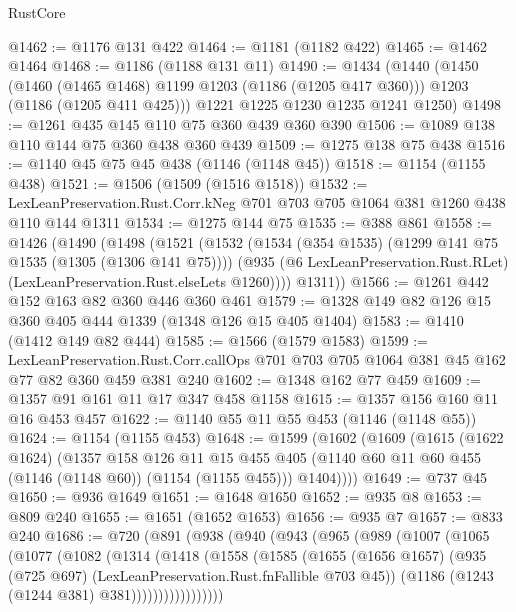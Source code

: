 \begin{lexlean}{RustCore}
\begin{coremodule}
@1462 := @1176 @131 @422
@1464 := @1181 (@1182 @422)
@1465 := @1462 @1464
@1468 := @1186 (@1188 @131 @11)
@1490 := @1434
    (@1440
      (@1450
        (@1460 (@1465 @1468) @1199 @1203 (@1186 (@1205 @417 @360)))
        @1203
        (@1186 (@1205 @411 @425)))
      @1221
      @1225
      @1230
      @1235
      @1241
      @1250)
@1498 := @1261 @435 @145 @110 @75 @360 @439 @360 @390
@1506 := @1089 @138 @110 @144 @75 @360 @438 @360 @439
@1509 := @1275 @138 @75 @438
@1516 := @1140 @45 @75 @45 @438 (@1146 (@1148 @45))
@1518 := @1154 (@1155 @438)
@1521 := @1506 (@1509 (@1516 @1518))
@1532 := LexLeanPreservation.Rust.Corr.kNeg @701 @703 @705 @1064 @381 @1260 @438 @110 @144 @1311
@1534 := @1275 @144 @75
@1535 := @388 @861
@1558 := @1426
    (@1490
      (@1498
        (@1521
          (@1532
            (@1534 (@354 @1535) (@1299 @141 @75 @1535 (@1305 (@1306 @141 @75))))
            (@935 (@6 LexLeanPreservation.Rust.RLet) (LexLeanPreservation.Rust.elseLets @1260))))
        @1311))
@1566 := @1261 @442 @152 @163 @82 @360 @446 @360 @461
@1579 := @1328 @149 @82 @126 @15 @360 @405 @444 @1339 (@1348 @126 @15 @405 @1404)
@1583 := @1410 (@1412 @149 @82 @444)
@1585 := @1566 (@1579 @1583)
@1599 := LexLeanPreservation.Rust.Corr.callOps
    @701
    @703
    @705
    @1064
    @381
    @45
    @162
    @77
    @82
    @360
    @459
    @381
    @240
@1602 := @1348 @162 @77 @459
@1609 := @1357 @91 @161 @11 @17 @347 @458 @1158
@1615 := @1357 @156 @160 @11 @16 @453 @457
@1622 := @1140 @55 @11 @55 @453 (@1146 (@1148 @55))
@1624 := @1154 (@1155 @453)
@1648 := @1599
    (@1602
      (@1609
        (@1615
          (@1622 @1624)
          (@1357
            @158
            @126
            @11
            @15
            @455
            @405
            (@1140 @60 @11 @60 @455 (@1146 (@1148 @60)) (@1154 (@1155 @455)))
            @1404))))
@1649 := @737 @45
@1650 := @936 @1649
@1651 := @1648 @1650
@1652 := @935 @8
@1653 := @809 @240
@1655 := @1651 (@1652 @1653)
@1656 := @935 @7
@1657 := @833 @240
@1686 := @720
    (@891
      (@938
        (@940
          (@943
            (@965
              (@989
                (@1007
                  (@1065
                    (@1077
                      (@1082
                        (@1314
                          (@1418
                            (@1558
                              (@1585
                                (@1655
                                  (@1656 @1657)
                                  (@935 (@725 @697) (LexLeanPreservation.Rust.fnFallible @703 @45))
                                  (@1186 (@1243 (@1244 @381) @381)))))))))))))))))

\end{coremodule}
\end{lexlean}
